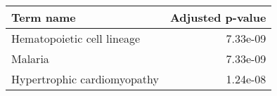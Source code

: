 \begin{tabular}{lr}
\toprule
                  Term name &  Adjusted p-value \\
\midrule
 Hematopoietic cell lineage &          7.33e-09 \\
                    Malaria &          7.33e-09 \\
Hypertrophic cardiomyopathy &          1.24e-08 \\
\bottomrule
\end{tabular}
